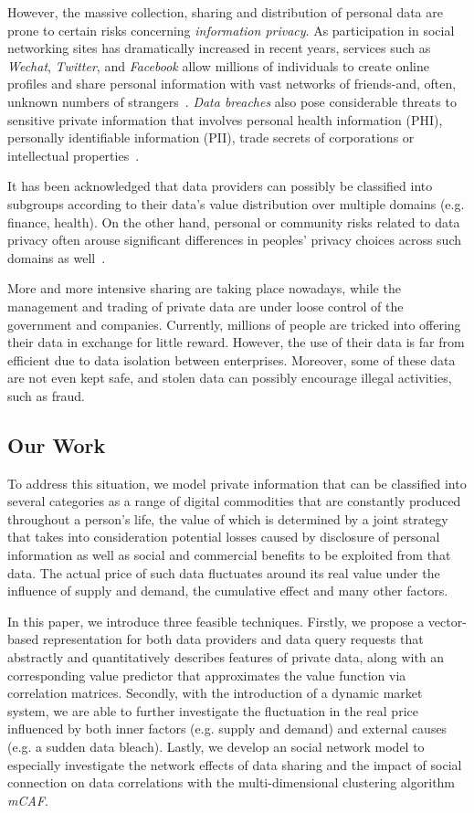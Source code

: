 \documentclass{mcmthesis}
\begin{document}
However, the massive collection, sharing and distribution of personal data are prone to certain risks concerning \emph{information privacy}. As participation in social networking sites has dramatically increased in recent years, services such as \emph{Wechat}, \emph{Twitter}, and \emph{Facebook} allow millions of individuals to create online profiles and share personal information with vast networks of friends-and, often, unknown numbers of strangers~\cite{gross2005information}. \emph{Data breaches} also pose considerable threats to sensitive private information that involves personal health information (PHI), personally identifiable information (PII), trade secrets of corporations or intellectual properties~\cite{wiki_data_breach}.

It has been acknowledged that data providers can possibly be classified into subgroups according to their data's value distribution over multiple domains (e.g. finance, health). On the other hand, personal or community risks related to data privacy often arouse significant differences in peoples' privacy choices across such domains as well~\cite{debatin2009facebook}. 

More and more intensive sharing are taking place nowadays, while the management and trading of private data are under loose control of the government and companies. Currently, millions of people are tricked into offering their data in exchange for little reward. However, the use of their data is far from efficient due to data isolation between enterprises. Moreover, some of these data are not even kept safe, and stolen data can possibly encourage illegal activities, such as fraud.

\subsection{Our Work}
To address this situation, we model private information that can be classified into several categories as a range of digital commodities that are constantly produced throughout a person's life, the value of which is determined by a joint strategy that takes into consideration potential losses caused by disclosure of personal information as well as social and commercial benefits to be exploited from that data. The actual price of such data fluctuates around its real value under the influence of supply and demand, the cumulative effect and many other factors. 

In this paper, we introduce three feasible techniques. Firstly, we propose a vector-based representation for both data providers and data query requests that abstractly and quantitatively describes features of private data, along with an corresponding value predictor that approximates the value function via correlation matrices. Secondly, with the introduction of a dynamic market system, we are able to further investigate the fluctuation in the real price influenced by both inner factors (e.g. supply and demand) and external causes (e.g. a sudden data bleach). Lastly, we develop an social network model to especially investigate the network effects of data sharing and the impact of social connection on data correlations with the multi-dimensional clustering algorithm \emph{mCAF}.
\end{document}
